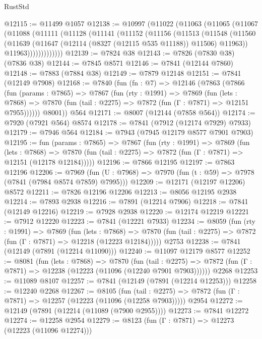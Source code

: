 \begin{lexlean}{RustStd}
\begin{coremodule}
{\begin{coremodule}
{{{{{{{{{{{{{{{{{{{{{{{{{{{{{{{{{{{{{{{{{{{{{{{{{{{{{{@12115 := @11499 @1057
@12138 := @10997
    (@11022
      (@11063
        (@11065
          (@11067
            (@11088
              (@11111
                (@11128
                  (@11141
                    (@11152
                      (@11156
                        (@11513
                          (@11548
                            (@11560
                              (@11639 (@11647 (@12114 (@8327 (@12115 @535 @11188)) @11506) @11963))
                              @11963)))))))))))))
@12139 := @7824 @38
@12143 := @7826 (@7830 @38) (@7836 @38)
@12144 := @7845 @8571
@12146 := @7841 (@12144 @7860)
@12148 := @7883 (@7884 @38)
@12149 := @7879 @12148
@12151 := @7841 (@12149 @7908)
@12168 := @7840
    (fun (fn : @7) =>
    @12146
      (@7863
        (@7866
          (fun (params : @7865) =>
          @7867
            (fun (rty : @1991) =>
            @7869
              (fun (lets : @7868) =>
              @7870 (fun (tail : @2275) => @7872 (fun (Γ : @7871) => @12151 @7955))))))
        @8001))
    @564
@12171 := @8007 (@12144 (@7858 @564))
@12174 := @7920 (@7921 @564) @8574
@12178 := @7841 (@7912 (@12174 @7929) @7933)
@12179 := @7946 @564
@12184 := @7943 (@7945 @12179 @8577 @7901 @7903)
@12195 := fun (params : @7865) =>
  @7867
    (fun (rty : @1991) =>
    @7869
      (fun (lets : @7868) =>
      @7870 (fun (tail : @2275) => @7872 (fun (Γ : @7871) => @12151 (@12178 @12184)))))
@12196 := @7866 @12195
@12197 := @7863 @12196
@12206 := @7969
    (fun (U : @7968) => @7970 (fun (t : @59) => @7978 (@7841 (@7984 @8574 @7859) @7995)))
@12209 := @12171 (@12197 @12206) @8572
@12211 := @7826 @12196 @12206
@12213 := @8056 @12195 @2938
@12214 := @7893 @2938
@12216 := @7891 (@12214 @7906)
@12218 := @7841 (@12149 @12216)
@12219 := @7928 @2938
@12220 := @12174 @12219
@12221 := @7912 @12220
@12223 := @7841 (@12221 @7933)
@12234 := @8059
    (fun (rty : @1991) =>
    @7869
      (fun (lets : @7868) =>
      @7870 (fun (tail : @2275) => @7872 (fun (Γ : @7871) => @12218 (@12223 @12184)))))
    @2753
@12238 := @7841 (@12149 (@7891 (@12214 @11090)))
@12240 := @11097 @12179 @8577
@12252 := @8081
    (fun (lets : @7868) =>
    @7870
      (fun (tail : @2275) =>
      @7872 (fun (Γ : @7871) => @12238 (@12223 (@11096 (@12240 @7901 @7903))))))
    @2268
@12253 := @11089 @8107
@12257 := @7841 (@12149 (@7891 (@12214 @12253)))
@12258 := @12240 @2268
@12267 := @8105
    (fun (tail : @2275) => @7872 (fun (Γ : @7871) => @12257 (@12223 (@11096 (@12258 @7903)))))
    @2954
@12272 := @12149 (@7891 (@12214 (@11089 (@7900 @2955))))
@12273 := @7841 @12272
@12274 := @12258 @2954
@12279 := @8123 (fun (Γ : @7871) => @12273 (@12223 (@11096 @12274)))
}}}}}}}}}}}}}}}}}}}}}}}}}}}}}}}}}}}}}}}}}}}}}}}}}}}}}}
\end{coremodule}}
\end{coremodule}
\end{lexlean}
